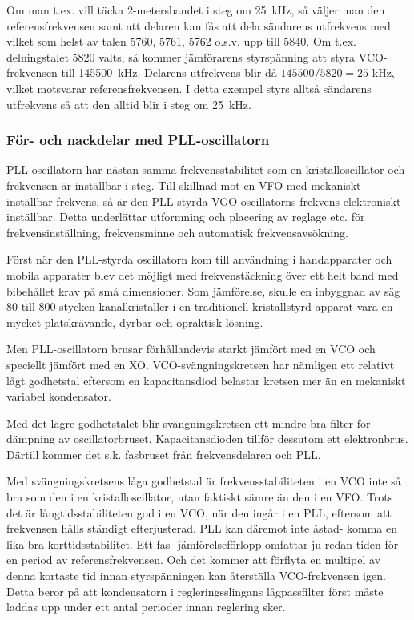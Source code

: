 Om man t.ex. vill täcka 2-metersbandet i steg om 25~kHz, så väljer
man den referensfrekvensen samt att delaren kan fås att dela sändarens
utfrekvens med vilket som helst av talen 5760, 5761, 5762 o.s.v. upp till 5840.
Om t.ex. delningstalet 5820 valts, så kommer jämförarens styrspänning att styra
VCO-frekvensen till 145500~kHz.
Delarens utfrekvens blir då \(145500/5820 = 25\) kHz, vilket motsvarar
referensfrekvensen.
I detta exempel styrs alltså sändarens utfrekvens så att den alltid blir i steg
om 25~kHz.

\subsubsection{För- och nackdelar med PLL-oscillatorn}

PLL-oscillatorn har nästan samma frekvensstabilitet som en
kristalloscillator och frekvensen är inställbar i steg.
Till skillnad mot en VFO med mekaniskt inställbar frekvens, så är den PLL-styrda
VGO-oscillatorns frekvens elektroniskt inställbar.
Detta underlättar utformning och placering av reglage etc. för
frekvensinställning, frekvensminne och automatisk frekvensavsökning.

Först när den PLL-styrda oscillatorn kom till användning i handapparater och
mobila apparater blev det möjligt med frekvenstäckning över ett helt band med
bibehållet krav på små dimensioner.
Som jämförelse, skulle en inbyggnad av säg 80 till 800 stycken kanalkristaller
i en traditionell kristallstyrd apparat vara en mycket platskrävande, dyrbar
och opraktisk lösning.

Men PLL-oscillatorn brusar förhållandevis starkt jämfört med en VCO
och speciellt jämfört med en XO.
VCO-svängningskretsen har nämligen ett relativt lågt godhetstal eftersom en
kapacitansdiod belastar kretsen mer än en mekaniskt variabel kondensator.

Med det lägre godhetstalet blir svängningskretsen ett mindre bra
filter för dämpning av oscillatorbruset.
Kapacitansdioden tillför dessutom ett elektronbrus.
Därtill kommer det s.k. fasbruset från frekvensdelaren och PLL.

Med svängningskretsens låga godhetstal är frekvensstabiliteten i en VCO inte så
bra som den i en kristalloscillator, utan faktiskt sämre än den i en VFO.
Trots det är långtidsstabiliteten god i en VCO, när den ingår i en PLL,
eftersom att frekvensen hålls ständigt efterjusterad.
PLL kan däremot inte åstad- komma en lika bra korttidsstabilitet.
Ett fas- jämförelseförlopp omfattar ju redan tiden för en period av
referensfrekvensen.
Och det kommer att förflyta en multipel av denna kortaste tid innan
styrspänningen kan återställa VCO-frekvensen igen.
Detta beror på att kondensatorn i regleringsslingans lågpassfilter först måste
laddas upp under ett antal perioder innan reglering sker.

